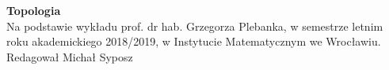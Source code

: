 \documentclass[twoside,10pt]{article}
\begin{document}
 
	\begin{titlepage} 
	    \begin{center} 
		\textbf{\Huge Topologia} \\[1cm]
		Na podstawie wykładu prof. dr hab. Grzegorza Plebanka, w semestrze letnim roku akademickiego 2018/2019,
		w Instytucie Matematycznym we Wrocławiu.\\ 
		Redagował Michał Syposz
	    \end{center} 
	    \tableofcontents
	\end{titlepage} 
	
	
	
	
	
	
	
\end{document}
